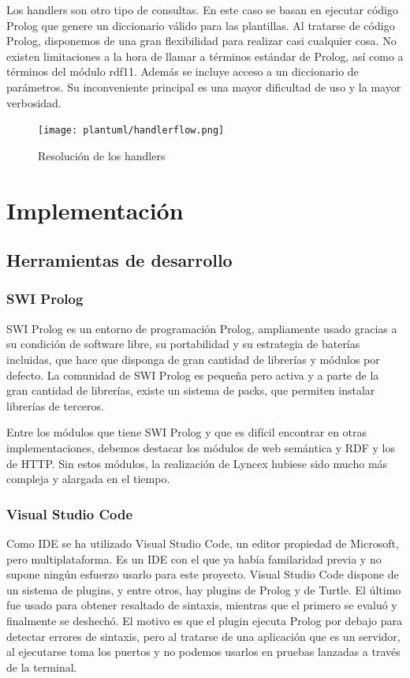 \documentclass[12pt]{report} %
\begin{document}
Los handlers son otro tipo de consultas. En este caso se basan en ejecutar código Prolog que genere un diccionario válido para las plantillas. Al tratarse de código Prolog, disponemos de una gran flexibilidad para realizar casi cualquier cosa. No existen limitaciones a la hora de llamar a términos estándar de Prolog, así como a términos del módulo rdf11. Además se incluye acceso a un diccionario de parámetros. Su inconveniente principal es una mayor dificultad de uso y la mayor verbosidad.

\begin{figure}
    \centering
    \texttt{[image: plantuml/handlerflow.png]}
    \caption{Resolución de los handlers}
    \label{fig:handlerflow}
\end{figure}

\chapter{Implementación}

\section{Herramientas de desarrollo}
\subsection{SWI Prolog}
SWI Prolog\cite{prolog} es un entorno de programación Prolog, ampliamente usado gracias a su condición de software libre, su portabilidad y 
su estrategia de baterías incluidas, que hace que disponga de gran cantidad de librerías y módulos por defecto.
La comunidad de SWI Prolog es pequeña pero activa y a parte de la gran cantidad de librerías, existe un sistema de packs, que permiten instalar librerías de terceros.

Entre los módulos que tiene SWI Prolog y que es difícil encontrar en otras implementaciones, debemos destacar los módulos de web semántica y RDF y los de HTTP.
Sin estos módulos, la realización de Lyncex hubiese sido mucho más compleja y alargada en el tiempo.

\subsection{Visual Studio Code}
Como IDE se ha utilizado Visual Studio Code\cite{vscode}, un editor propiedad de Microsoft, pero multiplataforma.
Es un IDE con el que ya había familaridad previa y no supone ningún esfuerzo usarlo para este proyecto.
Visual Studio Code dispone de un sistema de plugins, y entre otros, hay plugins de Prolog y de Turtle.
El último fue usado para obtener resaltado de sintaxis, mientras que el primero se evaluó y finalmente se deshechó.
El motivo es que el plugin ejecuta Prolog por debajo para detectar errores de sintaxis, pero al tratarse de una aplicación que es un servidor, al ejecutarse toma los puertos y no podemos usarlos
en pruebas lanzadas a través de la terminal.
\end{document}
